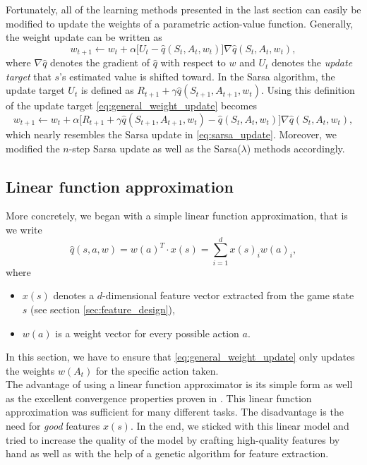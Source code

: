 Fortunately, all of the learning methods presented in the last section can easily be modified to update the weights of a parametric action-value function. Generally, the weight update can be written as
\begin{equation} \label{eq:general_weight_update}
	w_{t+1} \leftarrow w_t + \alpha \big[U_t - \hat q(S_t, A_t, w_t)\big]\nabla \hat q(S_t, A_t, w_t),
\end{equation}
where $\nabla \hat q$ denotes the gradient of $\hat q$ with respect to $w$ and $U_t$ denotes the \emph{update target} that $s$’s estimated value is shifted toward. In the Sarsa algorithm, the update target $U_t$ is defined as $R_{t+1} + \gamma \hat q(S_{t+1}, A_{t+1}, w_{t})$. Using this definition of the update target \ref{eq:general_weight_update} becomes
\begin{equation*}
	w_{t+1} \leftarrow w_t + \alpha \big[R_{t+1} + \gamma \hat q(S_{t+1}, A_{t+1}, w_t) - \hat q(S_t, A_t, w_t)\big]\nabla \hat q(S_t, A_t, w_t),
\end{equation*}
which nearly resembles the Sarsa update in \eqref{eq:sarsa_update}. Moreover, we modified the $n$-step Sarsa update as well as the Sarsa($\lambda$) methods accordingly. \\

\subsection{Linear function approximation}

More concretely, we began with a simple linear function approximation, that is we write
\begin{equation*}
	\hat q(s, a, w) = w(a)^T \cdot x(s) = \sum_{i=1}^d x(s)_i w(a)_i,
\end{equation*}
where
\begin{itemize}
	\item $x(s)$ denotes a $d$-dimensional feature vector extracted from the game state $s$ (see section \ref{sec:feature_design}), 
	\item $w(a)$ is a weight vector for every possible action $a$.
\end{itemize}
In this section, we have to ensure that \eqref{eq:general_weight_update} only updates the weights $w(A_t)$ for the specific action taken. \\

The advantage of using a linear function approximator is its simple form as well as the excellent convergence properties proven in \cite{NIPS2000_04df4d43}. This linear function approximation was sufficient for many different tasks. The disadvantage is the need for \emph{good} features $x(s)$. In the end, we sticked with this linear model and tried to increase the quality of the model by crafting high-quality features by hand as well as with the help of a genetic algorithm for feature extraction. 







